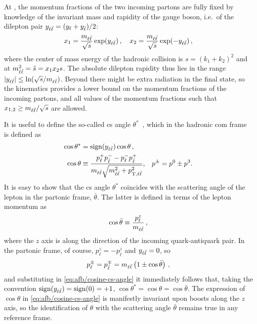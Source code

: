 At \lo, the momentum fractions of the two incoming partons are fully
fixed by knowledge of the invariant mass and rapidity of the gauge
boson, i.e.\ of the dilepton pair  $y_{\ell\bar{\ell}} = (y_\ell + y_{\bar{\ell}})/2$: 
\begin{equation}
  \label{eq:afb/x_fractions}
  x_1 = \frac{ m_{\ell\bar{\ell}}}{\sqrt{s}}\exp(y_{\ell\bar{\ell}}) \, ,\quad x_2 = \frac{
  m_{\ell\bar{\ell}}}{\sqrt{s}}\exp(-y_{\ell\bar{\ell}}) \, ,
\end{equation}
where the center of mass energy of the hadronic collision is
$s=(k_1+k_2)^2$ and at \lo
$m_{\ell\bar{\ell}}^2 = \hat s = x_1 x_2 s$. The absolute dilepton
rapidity thus lies in the range $|y_{\ell\bar{\ell}}|\le \ln (\sqrt{s}/m_{\ell\bar{\ell}})$.
Beyond \lo there might be extra radiation in the final state, so the \lo
kinematics provides a lower bound on the momentum fractions of the
incoming partons, and all values of the momentum
fractions such that $x_{1,2}\ge m_{\ell\bar{\ell}}/\sqrt s$ are allowed.

It is useful to define the so-called  \acrlong{cs}
angle $\theta^*$~\cite{Collins:1977iv}, which in the hadronic \acrfull{com}
frame is defined as
\begin{equation}
\begin{split}
  \cos\theta^* &= \operatorname{sign} (y_{\ell\bar{\ell}}) \cos\theta \, ,\\
  \cos\theta &\equiv\frac{p_\ell^+ p_{\bar{\ell}}^- - p_\ell^- p_{\bar{\ell}}^+}{m_{\ell\bar{\ell}} \sqrt{m_{\ell\bar{\ell}}^2 + p_{\mathrm{T},\ell\bar{\ell}}^2}} \text{,} \quad p^\pm = p^0 \pm p^3 \text{.}
  \label{eq:afb/cosine-cs-angle}
\end{split}
\end{equation}
It is easy to show that the \acrlong{cs} angle $\theta^*$ coincides with the
scattering angle of the lepton in the partonic \com frame, $\bar\theta$.
%
The latter is defined in terms of the lepton momentum as 
\begin{equation}
 \cos\bar\theta \equiv \frac{p^z_\ell}{m_{\ell\bar{\ell}}} \,, \label{eq:afb/coscm}
\end{equation}
where the $z$ axis is along the direction of the incoming quark-antiquark pair.
%
In the partonic \com frame, of course, $p^z_\ell=-p^z_{\bar \ell}$ and $y_{\ell\bar{\ell}}
=0$, so
\begin{equation}
p^\pm_\ell=p^{\mp}_{\bar{\ell}}=  m_{\ell\bar{\ell}} \left( 1\pm \cos{\bar\theta} \right)\, ,
\end{equation}
and substituting in \cref{eq:afb/cosine-cs-angle} it immediately follows that,
taking the convention 
$\operatorname{sign} (y_{\ell\bar{\ell}})=\operatorname{sign}(0)=+1$, 
$\cos\theta^*=\cos\theta=\cos{\bar\theta}$.
%
The expression of $\cos\theta$ in \cref{eq:afb/cosine-cs-angle} is manifestly
invariant upon boosts along the $z$ axis, so the identification of $\theta$
with the \com scattering angle $\bar\theta$ remains true in any reference
frame.

